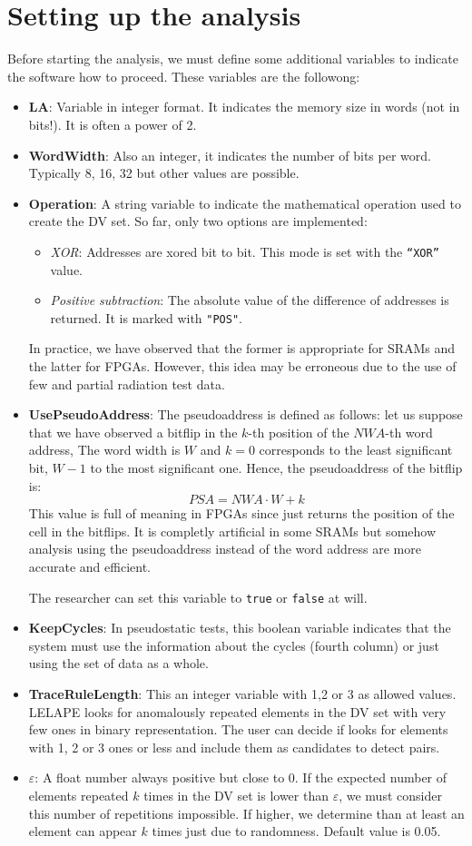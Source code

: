 \section{Setting up the analysis}
%
Before starting the analysis, we must define some additional variables to indicate the software how to proceed. These variables are the followong:
%
\begin{itemize}
	\item \textbf{LA}: Variable in integer format. It indicates the memory size in words (not in bits!). It is often a power of 2.
	\item \textbf{WordWidth}: Also an integer, it indicates the number of bits per word. Typically 8, 16, 32 but other values are possible.
	\item \textbf{Operation}: A string variable to indicate the mathematical operation used to create the DV set. So far, only two options are implemented:
	\begin{itemize}
		\item \textit{XOR}: Addresses are xored bit to bit. This mode is set with the \texttt{``XOR''} value.
		\item \textit{Positive subtraction}: The absolute value of the difference of addresses is returned. It is marked with \texttt{"POS"}. 
	\end{itemize}
	In practice, we have observed that the former is appropriate for SRAMs and the latter for FPGAs. However, this idea may be erroneous due to the use of few and partial radiation test data.
	\item \textbf{UsePseudoAddress}: The pseudoaddress is defined as follows: let us suppose that we have observed a bitflip in the $k$-th position of the $NWA$-th word address, The word width is $W$ and $k=0$ corresponds to the least significant bit, $W-1$ to the most significant one. Hence, the pseudoaddress of the bitflip is:
	\[
		PSA = NWA\cdot W + k
	\]
	This value is full of meaning in FPGAs since just returns the position of the cell in the bitflips. It is completly artificial in some SRAMs but somehow analysis using the pseudoaddress instead of the word address are more accurate and efficient. 
	
	The researcher can set this variable to \texttt{true} or \texttt{false} at will.
	\item \textbf{KeepCycles}: In pseudostatic tests, this boolean variable indicates that the system must use the information about the cycles (fourth column) or just using the set of data as a whole. 
	\item \textbf{TraceRuleLength}: This an integer variable with 1,2 or 3 as allowed values. LELAPE looks for anomalously repeated elements in the DV set with very few ones in binary representation. The user can decide if looks for elements with 1, 2 or 3 ones or less and include them as candidates to detect pairs. 
	\item \textbf{$\varepsilon$}: A float number always positive but close to 0. If the expected number of elements repeated $k$ times in the DV set is lower than $\varepsilon$, we must consider this number of repetitions impossible. If higher, we determine than at least an element can appear $k$ times just due to randomness. Default value is 0.05.
	

\end{itemize}
